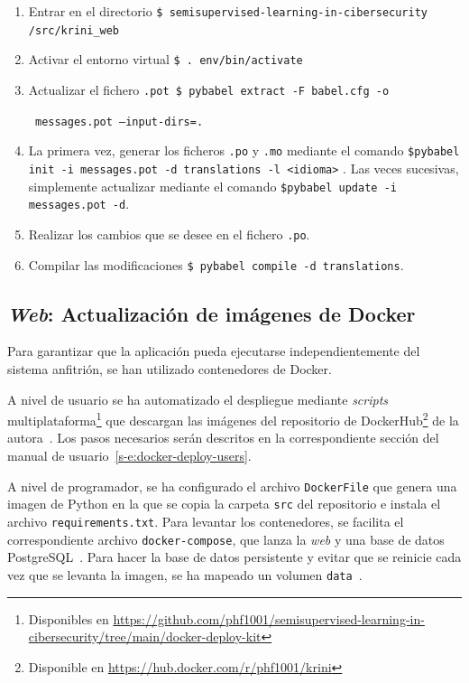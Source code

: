 \begin{enumerate}
	\item Entrar en el directorio \texttt{\$ semisupervised-learning-in-cibersecurity /src/krini\_web}
	\item Activar el entorno virtual \texttt{\$ . env/bin/activate}
	\item Actualizar el fichero \texttt{.pot \$ pybabel extract -F babel.cfg -o}
	
	\texttt{ messages.pot --input-dirs=. }
	\item La primera vez, generar los ficheros \texttt{.po} y \texttt{.mo} mediante el comando \texttt{\$pybabel init -i messages.pot -d translations -l <idioma>} .
	Las veces sucesivas, simplemente actualizar mediante el comando \texttt{\$pybabel update -i messages.pot -d}.
	\item Realizar los cambios que se desee en el fichero \texttt{.po}.
	\item Compilar las modificaciones \texttt{\$ pybabel compile -d translations}. 
\end{enumerate}

\subsection{\textit{Web}: Actualización de imágenes de Docker}

Para garantizar que la aplicación pueda ejecutarse independientemente del sistema anfitrión, se han utilizado contenedores de Docker.

A nivel de usuario se ha automatizado el despliegue mediante \textit{scripts} multiplataforma\footnote{Disponibles en \url{https://github.com/phf1001/semisupervised-learning-in-cibersecurity/tree/main/docker-deploy-kit}} que descargan las imágenes del repositorio de DockerHub\footnote{Disponible en \url{https://hub.docker.com/r/phf1001/krini}} de la autora~\cite{dockerHub}. Los pasos necesarios serán descritos en la correspondiente sección del manual de usuario~\ref{s-e:docker-deploy-users}.

A nivel de programador, se ha configurado el archivo \texttt{DockerFile} que genera una imagen de Python en la que se copia la carpeta \texttt{src} del repositorio e instala el archivo \texttt{requirements.txt}. Para levantar los contenedores, se facilita el correspondiente archivo \texttt{docker-compose}, que lanza la \textit{web} y una base de datos PostgreSQL~\cite{dockerFlaskPostgre}. Para hacer la base de datos persistente y evitar que se reinicie cada vez que se levanta la imagen, se ha mapeado un volumen \texttt{data}~\cite{dockerPersist}.

